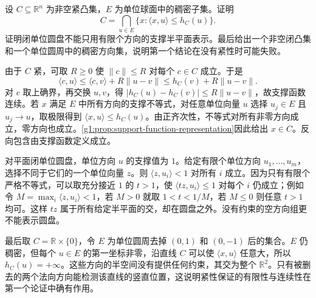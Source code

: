 \begin{exercise}\label{g1:ex:dense-support-directions}
	设 \(C\subseteq\mathbb R^n\) 为非空紧凸集，\(E\) 为单位球面中的稠密子集。证明
	\[
		C=\bigcap_{u\in E}\{x:\langle x,u\rangle\leq h_C(u)\}.
	\]
	证明闭单位圆盘不能只用有限个方向的支撑半平面表示。最后给出一个非空闭凸集和一个单位圆周中的稠密方向集，说明第一个结论在没有紧性时可能失败。
\end{exercise}
\begin{solution}
	由于 \(C\) 紧，可取 \(R\geq0\) 使 \(\lVert c\rVert\leq R\) 对每个 \(c\in C\) 成立。于是
	\[
		\langle c,u\rangle\leq\langle c,v\rangle+R\lVert u-v\rVert
		\leq h_C(v)+R\lVert u-v\rVert.
	\]
	对 \(c\) 取上确界，再交换 \(u,v\)，得 \(\lvert h_C(u)-h_C(v)\rvert\leq R\lVert u-v\rVert\)，故支撑函数连续。若 \(x\) 满足 \(E\) 中所有方向的支撑不等式，对任意单位向量 \(u\) 选择 \(u_j\in E\) 且 \(u_j\to u\)，取极限得到 \(\langle x,u\rangle\leq h_C(u)\)。由正齐次性，不等式对所有非零方向成立，零方向也成立。\cref{g1:prop:support-function-representation}因此给出 \(x\in C\)。反向包含由支撑函数定义成立。

	对平面闭单位圆盘，单位方向 \(u\) 的支撑值为 \(1\)。给定有限个单位方向 \(u_1,\ldots,u_m\)，选择不同于它们的一个单位向量 \(z\)。则 \(\langle z,u_i\rangle<1\) 对所有 \(i\) 成立。因为只有有限个严格不等式，可以取充分接近 \(1\) 的 \(t>1\)，使 \(\langle tz,u_i\rangle\leq1\) 对每个 \(i\) 仍成立；例如令 \(M=\max_i\langle z,u_i\rangle<1\)，若 \(M>0\) 就取 \(1<t<1/M\)，若 \(M\leq0\) 则任意 \(t>1\) 均可。这样 \(tz\) 属于所有给定半平面的交，却在圆盘之外。没有约束的空方向组更不能表示圆盘。

	最后取 \(C=\mathbb R\times\{0\}\)，令 \(E\) 为单位圆周去掉 \((0,1)\) 和 \((0,-1)\) 后的集合。\(E\) 仍稠密，但每个 \(u\in E\) 的第一坐标非零，沿直线 \(C\) 可以使 \(\langle x,u\rangle\) 任意大，所以 \(h_C(u)=+\infty\)。这些方向的半空间没有提供任何约束，其交为整个 \(\mathbb R^2\)。只有被删去的两个法向方向能检测该直线的竖直位置，这说明紧性保证的有限性与连续性在第一个论证中确有作用。
\end{solution}

